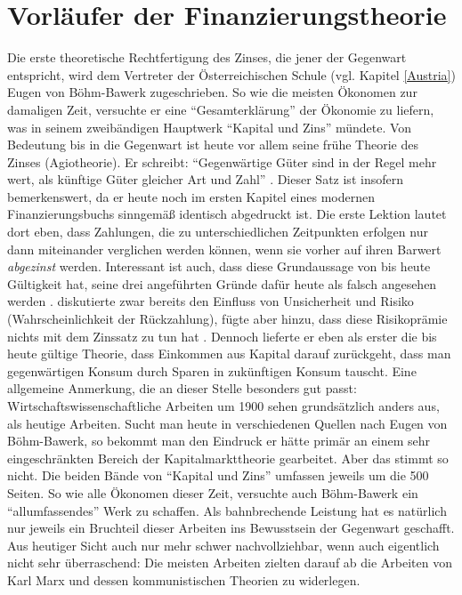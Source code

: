 \section{Vorläufer der Finanzierungstheorie}
\label{FisherundKnight}

Die erste theoretische Rechtfertigung des Zinses, die jener der Gegenwart entspricht, wird dem Vertreter der Österreichischen Schule (vgl. Kapitel \ref{Austria}) Eugen von Böhm-Bawerk zugeschrieben. So wie die meisten Ökonomen zur damaligen Zeit, versuchte er eine "`Gesamterklärung"' der Ökonomie zu liefern, was in seinem zweibändigen Hauptwerk "`Kapital und Zins"' mündete. Von Bedeutung bis in die Gegenwart ist heute vor allem seine frühe Theorie des Zinses (Agiotheorie). Er schreibt: "`Gegenwärtige Güter sind in der Regel mehr wert, als künftige Güter gleicher Art und Zahl"' \parencite[S. 248]{BohmBawerk1888}. Dieser Satz ist insofern bemerkenswert, da er heute noch im ersten Kapitel eines modernen Finanzierungsbuchs sinngemäß identisch abgedruckt ist. Die erste Lektion lautet dort eben, dass Zahlungen, die zu unterschiedlichen Zeitpunkten erfolgen nur dann miteinander verglichen werden können, wenn sie vorher auf ihren Barwert \textit{abgezinst} werden. Interessant ist auch, dass diese Grundaussage von  \textcite{BohmBawerk1888} bis heute Gültigkeit hat, seine drei angeführten Gründe dafür heute als falsch angesehen werden \parencite[S. 316]{Rosner2012}. \textcite[S. 258ff]{BohmBawerk1888} diskutierte zwar bereits den Einfluss von Unsicherheit und Risiko (Wahrscheinlichkeit der Rückzahlung), fügte aber hinzu, dass diese Risikoprämie nichts mit dem Zinssatz zu tun hat \parencite[S. 261]{BohmBawerk1888}. Dennoch lieferte er eben als erster die bis heute gültige Theorie, dass Einkommen aus Kapital darauf zurückgeht, dass man gegenwärtigen Konsum durch Sparen in zukünftigen Konsum tauscht. Eine allgemeine Anmerkung, die an dieser Stelle besonders gut passt: Wirtschaftswissenschaftliche Arbeiten um 1900 sehen grundsätzlich anders aus, als heutige Arbeiten. Sucht man heute in verschiedenen Quellen nach Eugen von Böhm-Bawerk, so bekommt man den Eindruck er hätte primär an einem sehr eingeschränkten Bereich der Kapitalmarkttheorie gearbeitet. Aber das stimmt so nicht. Die beiden Bände von "`Kapital und Zins"' umfassen jeweils um die 500 Seiten. So wie alle Ökonomen dieser Zeit, versuchte auch Böhm-Bawerk ein "`allumfassendes"' Werk zu schaffen. Als bahnbrechende Leistung hat es natürlich nur jeweils ein Bruchteil dieser Arbeiten ins Bewusstsein der Gegenwart geschafft. Aus heutiger Sicht auch nur mehr schwer nachvollziehbar, wenn auch eigentlich nicht sehr überraschend: Die meisten Arbeiten zielten darauf ab die Arbeiten von Karl Marx und dessen kommunistischen Theorien zu widerlegen. 

